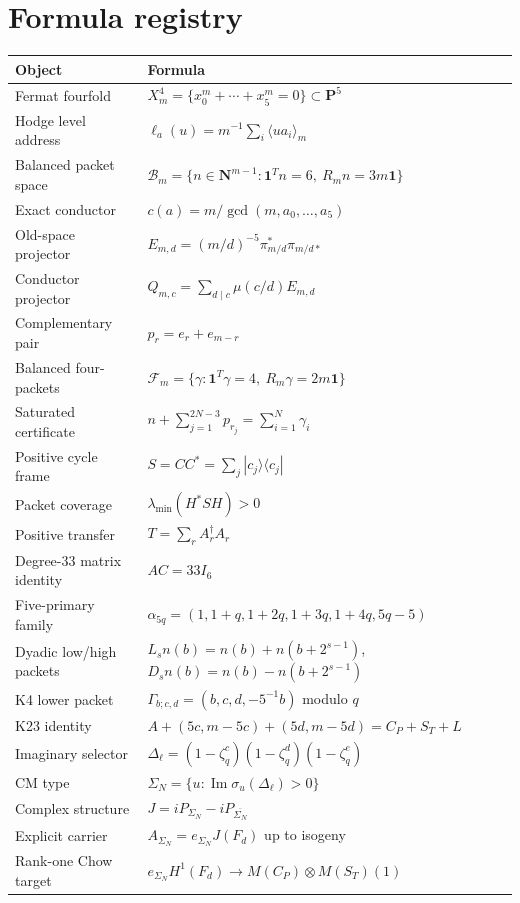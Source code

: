 \documentclass[11pt,oneside]{book}
\theoremstyle{definition}
\theoremstyle{remark}
\begin{document}
\chapter{Formula registry}
\begin{longtable}{p{}p{}}
\toprule
Object & Formula \\
\midrule
Fermat fourfold & $X_m^4=\{x_0^m+\cdots+x_5^m=0\}\subset\mathbf P^5$ \\
Hodge level address & $\ell_a(u)=m^{-1}\sum_i\langle ua_i\rangle_m$ \\
Balanced packet space & $\mathcal B_m=\{n\in\mathbf N^{m-1}:\mathbf1^Tn=6,\ R_mn=3m\mathbf1\}$ \\
Exact conductor & $c(a)=m/\gcd(m,a_0,\ldots,a_5)$ \\
Old-space projector & $E_{m,d}=(m/d)^{-5}\pi_{m/d}^*\pi_{m/d*}$ \\
Conductor projector & $Q_{m,c}=\sum_{d\mid c}\mu(c/d)E_{m,d}$ \\
Complementary pair & $p_r=e_r+e_{m-r}$ \\
Balanced four-packets & $\mathcal F_m=\{\gamma:\mathbf1^T\gamma=4,\ R_m\gamma=2m\mathbf1\}$ \\
Saturated certificate & $n+\sum_{j=1}^{2N-3}p_{r_j}=\sum_{i=1}^{N}\gamma_i$ \\
Positive cycle frame & $S=CC^*=\sum_j|c_j\rangle\langle c_j|$ \\
Packet coverage & $\lambda_{\min}(H^*SH)>0$ \\
Positive transfer & $T=\sum_rA_r^\dagger A_r$ \\
Degree-$33$ matrix identity & $AC=33I_6$ \\
Five-primary family & $\alpha_{5q}=(1,1+q,1+2q,1+3q,1+4q,5q-5)$ \\
Dyadic low/high packets & $L_sn(b)=n(b)+n(b+2^{s-1})$, $D_sn(b)=n(b)-n(b+2^{s-1})$ \\
K4 lower packet & $\Gamma_{b;c,d}=(b,c,d,-5^{-1}b)$ modulo $q$ \\
K23 identity & $A+(5c,m-5c)+(5d,m-5d)=C_P+S_T+L$ \\
Imaginary selector & $\Delta_\ell=(1-\zeta_q^c)(1-\zeta_q^d)(1-\zeta_q^e)$ \\
CM type & $\Sigma_N=\{u:\operatorname{Im}\sigma_u(\Delta_\ell)>0\}$ \\
Complex structure & $J=iP_{\Sigma_N}-iP_{\overline{\Sigma_N}}$ \\
Explicit carrier & $A_{\Sigma_N}=e_{\Sigma_N}J(F_d)$ up to isogeny \\
Rank-one Chow target & $e_{\Sigma_N}H^1(F_d)\to M(C_P)\otimes M(S_T)(1)$ \\
\bottomrule
\end{longtable}
\end{document}
